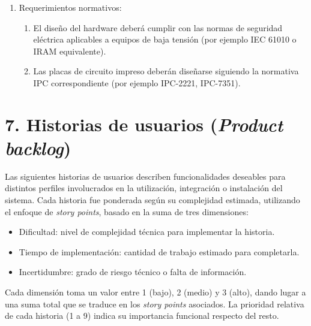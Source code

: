 \documentclass[
11pt, %
]{charter}
\begin{document}
\begin{enumerate}
	\item Requerimientos normativos:
		\begin{enumerate}
			\item El diseño del hardware deberá cumplir con las normas de seguridad eléctrica aplicables a equipos de baja tensión (por ejemplo IEC 61010 o IRAM equivalente).
			\item Las placas de circuito impreso deberán diseñarse siguiendo la normativa IPC correspondiente (por ejemplo IPC-2221, IPC-7351).
		\end{enumerate}
		

\end{enumerate}

\section{7. Historias de usuarios (\textit{Product backlog})}
\label{sec:backlog}

Las siguientes historias de usuarios describen funcionalidades deseables para distintos perfiles involucrados en la utilización, integración o instalación del sistema. Cada historia fue ponderada según su complejidad estimada, utilizando el enfoque de \textit{story points}, basado en la suma de tres dimensiones:

\begin{itemize}
	\item Dificultad: nivel de complejidad técnica para implementar la historia.
	\item Tiempo de implementación: cantidad de trabajo estimado para completarla.
	\item Incertidumbre: grado de riesgo técnico o falta de información.
\end{itemize}

Cada dimensión toma un valor entre 1 (bajo), 2 (medio) y 3 (alto), dando lugar a una suma total que se traduce en los \textit{story points} asociados. La prioridad relativa de cada historia (1 a 9) indica su importancia funcional respecto del resto.
\end{document}
